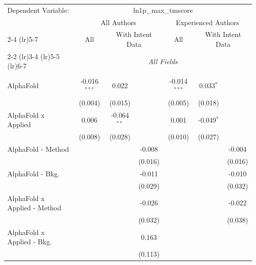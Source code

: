 \begingroup
\centering
\begin{tabular}{lcccccc}
   \tabularnewline \midrule \midrule
   Dependent Variable: & \multicolumn{6}{c}{ln1p\_max\_tmscore}\\
 & \multicolumn{3}{c}{All Authors} & \multicolumn{3}{c}{Experienced Authors} \\
\cmidrule(lr){2-4} \cmidrule(lr){5-7}
 & \multicolumn{1}{c}{All} & \multicolumn{2}{c}{With Intent Data} & \multicolumn{1}{c}{All} & \multicolumn{2}{c}{With Intent Data} \\
\cmidrule(lr){2-2} \cmidrule(lr){3-4} \cmidrule(lr){5-5} \cmidrule(lr){6-7}
 & \multicolumn{6}{c}{\textit{All Fields}} \\ \\
   AlphaFold                      & -0.016$^{***}$ & 0.022          &         & -0.014$^{***}$ & 0.033$^{*}$   &   \\   
                                  & (0.004)        & (0.015)        &         & (0.005)        & (0.018)       &   \\   
   AlphaFold x Applied            & 0.006          & -0.064$^{**}$  &         & 0.001          & -0.049$^{*}$  &   \\   
                                  & (0.008)        & (0.028)        &         & (0.010)        & (0.027)       &   \\   
   AlphaFold - Method             &                &                & -0.008  &                &               & -0.004\\   
                                  &                &                & (0.016) &                &               & (0.016)\\   
   AlphaFold - Bkg.               &                &                & -0.011  &                &               & -0.010\\   
                                  &                &                & (0.029) &                &               & (0.032)\\   
   AlphaFold x Applied - Method   &                &                & -0.026  &                &               & -0.022\\   
                                  &                &                & (0.032) &                &               & (0.038)\\   
   AlphaFold x Applied - Bkg.     &                &                & 0.163   &                &               &   \\   
                                  &                &                & (0.113) &                &               &   \\   

\end{tabular}
